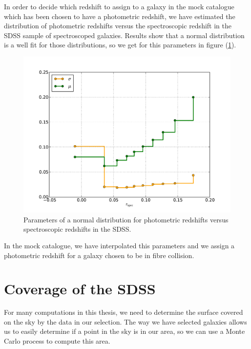 In order to decide which redshift to assign to a galaxy in the mock catalogue
which has been chosen to have a photometric redshift, we have estimated the
distribution of photometric redshifts versus the spectroscopic redshift in the
SDSS sample of spectroscoped galaxies. Results show that a normal distribution
is a well fit for those distributions, so we get for this parameters in figure
(\ref{fig:evolnormred}).
%
\begin{figure}[htb]
    \centering
    \includegraphics[width=0.8\linewidth]{figures/sdss/EvolErrZphotSDSSDR8EqualBins}
    \caption{Parameters of a normal distribution for photometric redshifts
    versus spectroscopic redshifts in the SDSS.}
\label{fig:evolnormred}
\end{figure}

In the mock catalogue, we have interpolated this parameters and we assign a
photometric redshift for a galaxy chosen to be in fibre collision.
%
\section{Coverage of the SDSS}
%
For many computations in this thesis, we need to determine the surface covered
on the sky by the data in our selection. The way we have selected galaxies
allows us to easily determine if a point in the sky is in our area, so we can
use a Monte Carlo process to compute this area.

